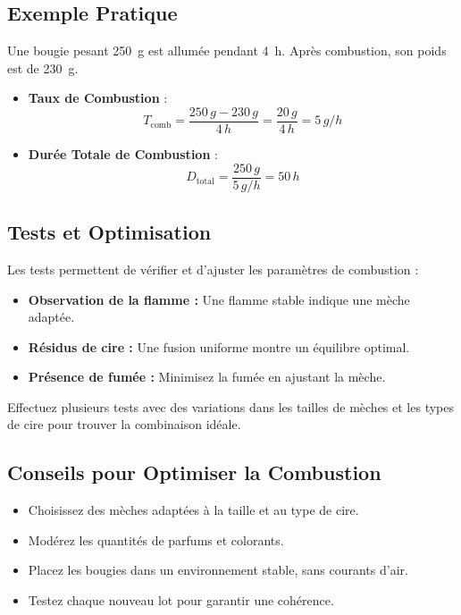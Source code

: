 \documentclass[11pt,fleqn,onecolumn,oneside]{book}
\begin{document}
\subsection*{Exemple Pratique}

Une bougie pesant \SI{250}{\gram} est allumée pendant \SI{4}{\hour}. Après combustion, son poids est de \SI{230}{\gram}.
\begin{itemize}
    \item \textbf{Taux de Combustion} :
    \[
    T_{\text{comb}} = \frac{250\,g - 230\,g}{4\,h} = \frac{20\,g}{4\,h} = 5\,g/h
    \]
    \item \textbf{Durée Totale de Combustion} :
    \[
    D_{\text{total}} = \frac{250\,g}{5\,g/h} = 50\,h
    \]
\end{itemize}

\subsection*{Tests et Optimisation}

Les tests permettent de vérifier et d’ajuster les paramètres de combustion :
\begin{itemize}
    \item \textbf{Observation de la flamme :} Une flamme stable indique une mèche adaptée.
    \item \textbf{Résidus de cire :} Une fusion uniforme montre un équilibre optimal.
    \item \textbf{Présence de fumée :} Minimisez la fumée en ajustant la mèche.
\end{itemize}

\begin{exercise}
Effectuez plusieurs tests avec des variations dans les tailles de mèches et les types de cire pour trouver la combinaison idéale.
\end{exercise}

\subsection*{Conseils pour Optimiser la Combustion}

\begin{itemize}
    \item Choisissez des mèches adaptées à la taille et au type de cire.
    \item Modérez les quantités de parfums et colorants.
    \item Placez les bougies dans un environnement stable, sans courants d’air.
    \item Testez chaque nouveau lot pour garantir une cohérence.
\end{itemize}
\end{document}
